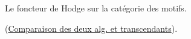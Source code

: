 Le foncteur de Hodge sur la catégorie des motifs.

(\uline{Comparaison des deux  alg. et transcendants}).

